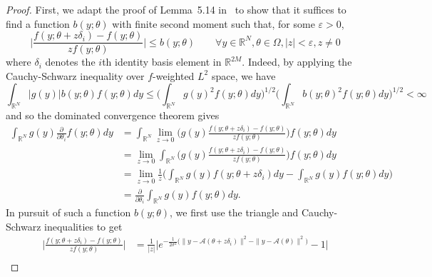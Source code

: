 \documentclass[times,10pt]{elsarticle}
\theoremstyle{plain}
\begin{document}
\begin{proof}
First, we adapt the proof of Lemma~5.14 in~\cite{LehmannC:98} to show that it suffices to find a function $b(y;\theta)$ with finite second moment such that, for some $\varepsilon>0$,
\begin{equation}
\label{eq.b requirement}
\bigg|\frac{f(y;\theta+z\delta_i)-f(y;\theta)}{zf(y;\theta)}\bigg|\leq b(y;\theta)
\qquad
\forall y\in\mathbb{R}^{N}, \theta\in\Omega, |z|<\varepsilon, z\neq0
\end{equation}
where $\delta_i$ denotes the $i$th identity basis element in $\mathbb{R}^{2M}$.
Indeed, by applying the Cauchy-Schwarz inequality over $f$-weighted $L^2$ space, we have
\begin{equation*}
\int_{\mathbb{R}^N}|g(y)|b(y;\theta)f(y;\theta)dy
\leq\bigg(\int_{\mathbb{R}^N}g(y)^2f(y;\theta)dy
\bigg)^{1/2}\bigg(\int_{\mathbb{R}^N}b(y;\theta)^2f(y;\theta)dy
\bigg)^{1/2}
<\infty
\end{equation*}
and so the dominated convergence theorem gives
\begin{align*}
\int_{\mathbb{R}^N}g(y)\frac{\partial}{\partial\theta_i}f(y;\theta)dy
&=\int_{\mathbb{R}^N}\lim_{z\rightarrow0}\bigg(g(y)\frac{f(y;\theta+z\delta_i)-f(y;\theta)}{zf(y;\theta)}\bigg)f(y;\theta)dy\\
&=\lim_{z\rightarrow0}\int_{\mathbb{R}^N}\bigg(g(y)\frac{f(y;\theta+z\delta_i)-f(y;\theta)}{zf(y;\theta)}\bigg)f(y;\theta)dy\\
&=\lim_{z\rightarrow0}\frac{1}{z}\bigg(\int_{\mathbb{R}^N}g(y)f(y;\theta+z\delta_i)dy-\int_{\mathbb{R}^N}g(y)f(y;\theta)dy\bigg)\\
&=\frac{\partial}{\partial\theta_i}\int_{\mathbb{R}^N}g(y)f(y;\theta)dy.
\end{align*}
In pursuit of such a function $b(y;\theta)$, we first use the triangle and Cauchy-Schwarz inequalities to get
\begin{align}
\bigg|\frac{f(y;\theta+z\delta_i)-f(y;\theta)}{zf(y;\theta)}\bigg|
\nonumber
&=\frac{1}{|z|}\Big|e^{-\frac{1}{2\sigma^2}\big(\|y-\mathcal{A}(\theta+z\delta_i)\|^2-\|y-\mathcal{A}(\theta)\|^2\big)}-1\Big|\\
\nonumber

\end{align}
\end{proof}
\end{document}
